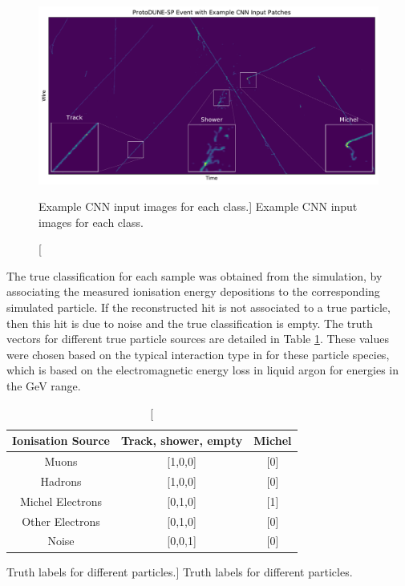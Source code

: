 \begin{figure}
	\centering
	\includegraphics[width=\textwidth]{figures/patch_zoom.pdf}  
	\caption
	[Example CNN input images for each class.]
	{Example CNN input images for each class.}
	\label{fig:patches}
\end{figure}

The true classification for each sample was obtained from the simulation, by 
associating the measured ionisation energy depositions to the corresponding
simulated particle. If the reconstructed hit is not associated to a true
particle, then this hit is due to noise and the true classification is empty.
The truth vectors for different true particle sources are detailed in Table
\ref{tab:ground_truth}. These values were chosen based on the typical
interaction type in \protodune{} for these particle species, which is based on
the electromagnetic energy loss in liquid argon for energies in the GeV range.

\begin{table}
	\centering
	\begin{tabular}{c|c|c}
		Ionisation Source & Track, shower, empty & Michel \\ \hline
		Muons             & [1,0,0]              & [0]    \\
		Hadrons           & [1,0,0]              & [0]    \\
		Michel Electrons  & [0,1,0]              & [1]    \\
		Other Electrons   & [0,1,0]              & [0]    \\
		Noise             & [0,0,1]              & [0]    \\
	\end{tabular}
	\caption
	[Truth labels for different particles.]
	{Truth labels for different particles.}
	\label{tab:ground_truth}
\end{table}

